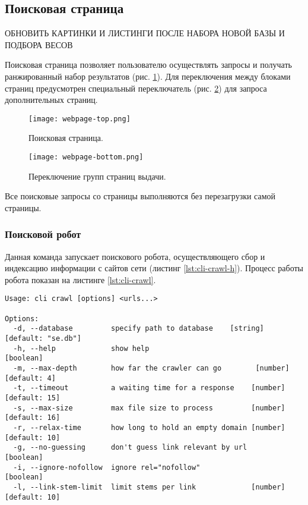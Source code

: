 \subsection*{Поисковая страница}
{\Large ОБНОВИТЬ КАРТИНКИ И ЛИСТИНГИ ПОСЛЕ НАБОРА НОВОЙ БАЗЫ И ПОДБОРА ВЕСОВ}

Поисковая страница позволяет пользователю осуществлять запросы и получать ранжированный набор результатов (рис. \ref{fig:webpage-top}). Для переключения между блоками страниц предусмотрен специальный переключатель (рис. \ref{fig:webpage-bottom}) для запроса дополнительных страниц.

\begin{figure}[h]
  \centering
  \texttt{[image: webpage-top.png]}
  \caption{Поисковая страница.}
  \label{fig:webpage-top}
\end{figure}

\begin{figure}[h]
  \centering
  \texttt{[image: webpage-bottom.png]}
  \caption{Переключение групп страниц выдачи.}
  \label{fig:webpage-bottom}
\end{figure}

Все поисковые запросы со страницы выполняются без перезагрузки самой страницы.


\subsubsection*{Поисковой робот}
Данная команда запускает поискового робота, осуществляющего сбор и индексацию информации с сайтов сети (листинг \ref{lst:cli-crawl-h}). Процесс работы робота показан на листинге \ref{lst:cli-crawl}.
\begin{lstlisting}[caption=Интерфейс командной строки: поисковой робот., label=lst:cli-crawl-h]
Usage: cli crawl [options] <urls...>

Options:
  -d, --database         specify path to database    [string] [default: "se.db"]
  -h, --help             show help                                     [boolean]
  -m, --max-depth        how far the crawler can go        [number] [default: 4]
  -t, --timeout          a waiting time for a response    [number] [default: 15]
  -s, --max-size         max file size to process         [number] [default: 16]
  -r, --relax-time       how long to hold an empty domain [number] [default: 10]
  -g, --no-guessing      don't guess link relevant by url              [boolean]
  -i, --ignore-nofollow  ignore rel="nofollow"                         [boolean]
  -l, --link-stem-limit  limit stems per link             [number] [default: 10]
\end{lstlisting}

